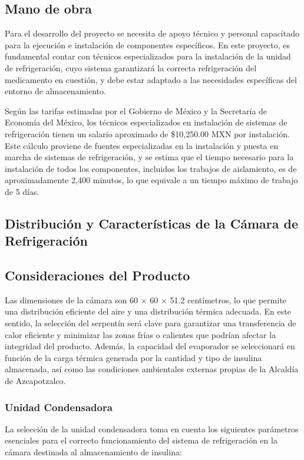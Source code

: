  \subsection{Mano de obra}
 Para el desarrollo del proyecto se necesita de apoyo técnico y personal capacitado para la ejecución e instalación de componentes específicos. En este proyecto, es fundamental contar con técnicos especializados para la instalación de la unidad de refrigeración, cuyo sistema garantizará la correcta refrigeración del medicamento en cuestión, y debe estar adaptado a las necesidades específicas del entorno de almacenamiento.
 
 
 Según las tarifas estimadas por el Gobierno de México y la Secretaría de Economía del México, los técnicos especializados en instalación de sistemas de refrigeración tienen un salario aproximado de \$10,250.00 MXN por instalación. Este cálculo proviene de fuentes especializadas en la instalación y puesta en marcha de sistemas de refrigeración, y se estima que el tiempo necesario para la instalación de todos los componentes, incluidos los trabajos de aislamiento, es de aproximadamente 2,400 minutos, lo que equivale a un tiempo máximo de trabajo de 5 días.

 \subsection{Distribución y Características de la Cámara de Refrigeración}
 \subsection{Consideraciones del Producto}
Las dimensiones de la cámara son 60 × 60 × 51.2 centímetros, lo que permite una distribución eficiente del aire y una distribución térmica adecuada. En este sentido, la selección del serpentín será clave para garantizar una transferencia de calor eficiente y minimizar las zonas frías o calientes que podrían afectar la integridad del producto. Además, la capacidad del evaporador se seleccionará en función de la carga térmica generada por la cantidad y tipo de insulina almacenada, así como las condiciones ambientales externas propias de la Alcaldía de Azcapotzalco.


 \subsubsection{Unidad Condensadora}
 La selección de la unidad condensadora toma en cuenta los siguientes parámetros esenciales para el correcto funcionamiento del sistema de refrigeración en la cámara destinada al almacenamiento de insulina:
 
